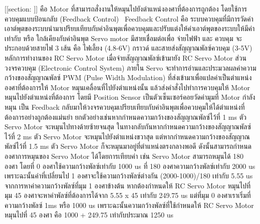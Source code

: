 [[section: ]]
    คือ Motor ที่สามารถสั่งงานให้หมุนไปยังตำแหน่งองศาที่ต้องการถูกต้อง โดยใช้การควบคุมแบบป้อนกลับ (Feedback Control)  Feedback Control 
    คือ ระบบควบคุมที่มีการวัดค่าเอาต์พุตของระบบนำมาเปรียบเทียบกับค่าอินพุตเพื่อควบคุมและปรับแต่งให้ค่าเอาต์พุตของระบบให้มีค่า เท่ากับ หรือ ใกล้เคียงกับค่าอินพุต Servo motor 
    มีสายเชื่อมต่อเพื่อ จ่ายไฟฟ้า และ ควบคุม จะประกอบด้วยสายไฟ 3 เส้น คือ ไฟเลี้ยง (4.8-6V) กราวด์ และสายส่งสัญญาณพัลซ์ควบคุม (3-5V) 
    หลักการทำงานของ RC Servo Motor เมื่อจ่ายสัญญาณพัลซ์เข้ามายัง RC Servo Motor ส่วนวงจรควบคุม (Electronic Control System) ภายใน Servo 
    จะทำการอ่านและประมวลผลค่าความกว้างของสัญญาณพัลซ์ PWM (Pulse Width Modulation) ที่ส่งเข้ามาเพื่อแปลค่าเป็นตำแหน่งองศาที่ต้องการให้ Motor 
    หมุนเคลื่อนที่ไปยังตำแหน่งนั้น แล้วส่งคำสั่งไปทำการควบคุมให้ Motor หมุนไปยังตำแหน่งที่ต้องการ โดยมี Position Sensor เป็นตัวเซ็นเซอร์คอยวัดค่ามุมที่ Motor กำลังหมุน 
    เป็น Feedback กลับมาให้วงจรควบคุมเปรียบเทียบกับค่าอินพุตเพื่อควบคุมให้ได้ตำแหน่งที่ต้องการอย่างถูกต้องแม่นยำ
    ยกตัวอย่างเช่นหากกำหนดความกว้างของสัญญาณพัลซ์ไว้ที่ 1 ms ตัว Servo Motor จะหมุนไปทางด้ายซ้ายจนสุด ในทางกลับกันหากกำหนดความกว้างของสัญญาณพัลซ์ไว้ที่ 2 ms 
    ตัว Servo Motor จะหมุนไปยังตำแหน่งขวาสุด แต่หากกำหนดความกว้างของสัญญาณพัลซ์ไว้ที่ 1.5 ms ตัว Servo Motor ก็จะหมุนมาอยู่ที่ตำแหน่งตรงกลางพอดี ดังนั้นสามารถกำหนดองศาการหมุนของ Servo Motor ได้โดยการเทียบค่า 
    เช่น Servo Motor สามารถหมุนได้ 180 องศา โดยที่ 0 องศาใช้ความกว้างพัลซ์เท่ากับ 1000 us ที่ 180 องศาความกว้างพัลซ์เท่ากับ 2000 us เพราะฉะนั้นค่าที่เปลี่ยนไป 1 องศาจะใช้ความกว้างพัลซ์ต่างกัน (2000-1000)/180 เท่ากับ 5.55 us 
    จากการหาค่าความกว้างพัลซ์ที่มุม 1 องศาข้างต้น หากต้องกำหนดให้ RC Servo Motor หมุนไปที่มุม 45 องศาจะหาค่าพัลซ์ที่ต้องการได้จาก 5.55 x 45 เท่ากับ 249.75 us 
    แต่ที่มุม 0 องศาเราเริ่มที่ความกว้างพัลซ์ 1ms หรือ 1000 us เพราะฉะนั้นความกว้างพัลซ์ที่ใช้กำหนดให้ RC Servo Motor หมุนไปที่ 45 องศา คือ 1000 + 249.75 เท่ากับประมาณ 1250 us
